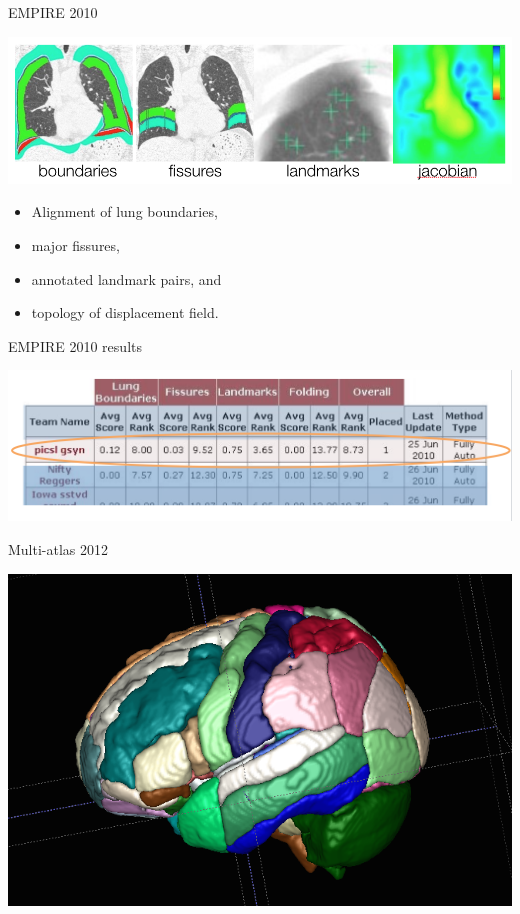 \documentclass[ignorenonframetext,]{beamer}
\begin{document}
\begin{frame}{EMPIRE 2010}

\includegraphics{./competitions/figures/EMPIRE10criteria.png}

\begin{itemize}
\item
  Alignment of lung boundaries,
\item
  major fissures,
\item
  annotated landmark pairs, and
\item
  topology of displacement field.
\end{itemize}

\end{frame}

\begin{frame}{EMPIRE 2010 results}

\includegraphics{./competitions/figures/EMPIRE10Results.png}

\end{frame}

\begin{frame}{Multi-atlas 2012}

\includegraphics{./competitions/figures/NKI30_MALF.png}

\end{frame}
\end{document}
